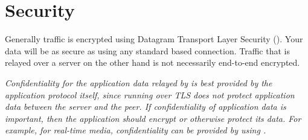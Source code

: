 \section{Security}
Generally  traffic is encrypted using Datagram Transport Layer Security (). Your data will be as secure as using any standard  based connection. Traffic that is relayed over a  server on the other hand is not necessarily end-to-end encrypted.

\textit{Confidentiality for the application data relayed by  is best provided by the application protocol itself, since running  over TLS does not protect application data between the server and the peer. If confidentiality of application data is important, then the application should encrypt or otherwise protect its data. For example, for real-time media, confidentiality can be provided by using .}~\autocite{TURN:sec}